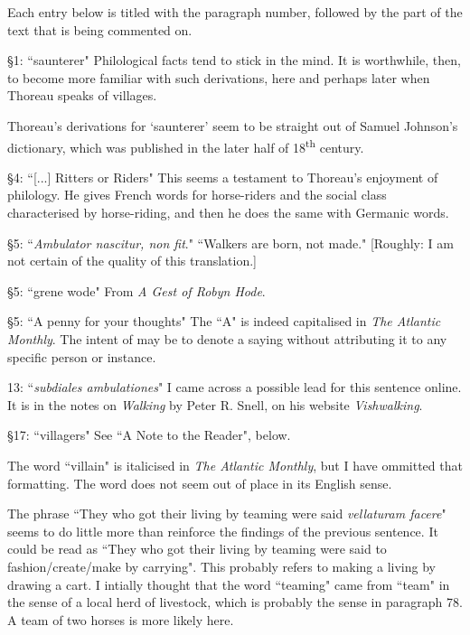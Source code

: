 \documentclass[twoside,openright,10pt]{memoir} %
\begin{document}
Each entry below is titled with the paragraph number, followed by the part of the text that is being commented on.

§1: “saunterer"\newline
Philological facts tend to stick in the mind. It is worthwhile, then, to become more familiar with such derivations, here and perhaps later when Thoreau speaks of villages.

Thoreau's derivations for `saunterer' seem to be straight out of Samuel Johnson's dictionary, which was published in the later half of 18\textsuperscript{th} century.

§4: “[...] Ritters or Riders"\newline
This seems a testament to Thoreau's enjoyment of philology. He gives French words for horse-riders and the social class characterised by horse-riding, and then he does the same with Germanic words.

§5: “\emph{Ambulator nascitur, non fit}."\newline
“Walkers are born, not made." [Roughly: I am not certain of the quality of this translation.]

§5: “grene wode"\newline
From \emph{A Gest of Robyn Hode}.

§5: “A penny for your thoughts"\newline
The “A" is indeed capitalised in \emph{The Atlantic Monthly}. The intent of may be to denote a saying without attributing it to any specific person or instance.

13: “\emph{subdiales ambulationes}"\newline
I came across a possible lead for this sentence online. It is in the notes on \emph{Walking} by Peter R. Snell, on his website \emph{Vishwalking}.

§17: “villagers"\newline
See “A Note to the Reader", below.

The word “villain" is italicised in \emph{The Atlantic Monthly}, but I have ommitted that formatting. The word does not seem out of place in its English sense.

The phrase “They who got their living by teaming were said \emph{vellaturam facere}" seems to do little more than reinforce the findings of the previous sentence. It could be read as “They who got their living by teaming were said to fashion/create/make by carrying". This probably refers to making a living by drawing a cart. I intially thought that the word “teaming" came from “team" in the sense of a local herd of livestock, which is probably the sense in paragraph 78. A team of two horses is more likely here. 
\end{document}

